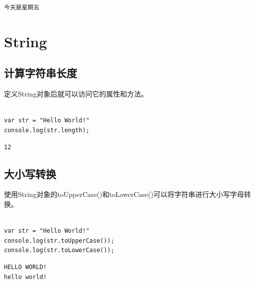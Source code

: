 \begin{tcolorbox}
	\begin{verbatim}
今天是星期五
	\end{verbatim}
\end{tcolorbox}

\newpage

\section{String}

\subsection{计算字符串长度}

定义String对象后就可以访问它的属性和方法。 \\

 \\

\begin{lstlisting}[style=htmlcssjs]
var str = "Hello World!"
console.log(str.length);
\end{lstlisting}

\begin{tcolorbox}
	\begin{verbatim}
12
	\end{verbatim}
\end{tcolorbox}

\subsection{大小写转换}

使用String对象的toUpperCase()和toLowerCase()可以将字符串进行大小写字母转换。 \\

 \\

\begin{lstlisting}[style=htmlcssjs]
var str = "Hello World!"
console.log(str.toUpperCase());
console.log(str.toLowerCase());
\end{lstlisting}

\begin{tcolorbox}
	\begin{verbatim}
HELLO WORLD!
hello world!
	\end{verbatim}
\end{tcolorbox}

